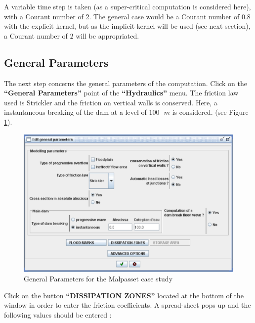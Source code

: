 \documentclass[a4paper,12pt]{article}
\begin{document}
\vspace{0.5cm}

A variable time step is taken (as a super-critical computation is
considered here), with a Courant number of $2$. The general case would
be a Courant number of $0.8$ with the explicit kernel, but as the implicit
kernel will be used (see next section), a Courant number of $2$ will
be appropriated.


\subsection{General Parameters}

\hspace{0.5cm}The next step concerns the general parameters of the computation.
Click on the \textbf{{}``General Parameters''} point of the \textbf{{}``Hydraulics''}
menu. The friction law used is Strickler and the friction on vertical
walls is conserved. Here, a instantaneous breaking of the dam at a
level of $100\mbox{ }m$ is considered. (see Figure \ref{fig:General-Parameters-for}).

\newpage

\begin{figure}[h]
  \begin{center}
  \includegraphics[scale=0.5]{general_params2}
  \caption{General Parameters for the Malpasset case study}
  \label{fig:General-Parameters-for}
  \end{center}
\end{figure}


Click on the button \textbf{{}``DISSIPATION ZONES''} located at
the bottom of the window in order to enter the friction coefficients.
A spread-sheet pops up and the following values should be entered
: 
\end{document}
